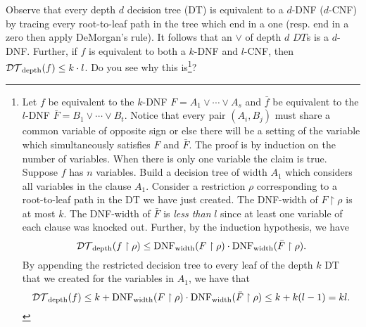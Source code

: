 \documentclass[11pt]{article}
\begin{document}
	Observe that every depth $d$ decision tree (DT) is equivalent to a $d$-DNF ($d$-CNF) by tracing every root-to-leaf path in the tree which end in a one (resp. end in a zero then apply DeMorgan's rule). It follows that an $\lor$ of depth $d$ $DT$s is a $d$-DNF. Further, if $f$ is equivalent to both a $k$-DNF and $l$-CNF, then $\mathcal{DT}_{\mathrm{depth}}(f)\leq k \cdot l$. Do you see why this is\footnote{Let $f$ be equivalent to the $k$-DNF $F = A_1 \lor \cdots \lor A_s$ and $\bar{f}$ be equivalent to the $l$-DNF $\bar{F} = B_1 \lor \cdots \lor B_t$. Notice that every pair $(A_i, B_j)$ must share a common variable of opposite sign or else there will be a setting of the variable which simultaneously satisfies $F$ and $\bar{F}$. The proof is by induction on the number of variables. When there is only one variable the claim is true. Suppose $f$ has $n$ variables. Build a decision tree of width $A_1$ which considers all variables in the clause $A_1$. Consider a restriction $\rho$ corresponding to a root-to-leaf path in the DT we have just created. The DNF-width of $F \upharpoonright \rho$ is at most $k$. The DNF-width of $\bar{F}$ is \emph{less than} $l$ since at least one variable of each clause was knocked out. Further, by the induction hypothesis, we have
		\[\mathcal{DT}_{\mathrm{depth}}(f \upharpoonright \rho) \leq \mathrm{DNF}_{\mathrm{width}}(F \upharpoonright \rho) \cdot \mathrm{DNF}_{\mathrm{width}}(\bar{F} \upharpoonright \rho).\]
		By appending the restricted decision tree to every leaf of the depth $k$ DT that we created for the variables in $A_1$, we have that
		\[\mathcal{DT}_{\mathrm{depth}}(f) \leq k + \mathrm{DNF}_{\mathrm{width}}(F \upharpoonright \rho) \cdot \mathrm{DNF}_{\mathrm{width}}(\bar{F} \upharpoonright \rho) \leq k + k(l-1) = kl.\]}?
	
\end{document}
